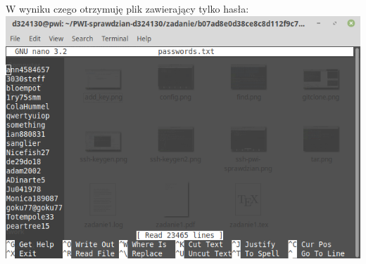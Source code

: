 \documentclass{article}
\begin{document}
\begin{enumerate}
 W wyniku czego otrzymuję plik zawierający tylko hasła:\\
 \includegraphics[scale=0.4]{pass.png}









 \end{enumerate}
\end{document}
